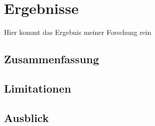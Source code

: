 \section{Ergebnisse}
Hier kommt das Ergebnis meiner Forschung rein
\subsection{Zusammenfassung}
\subsection{Limitationen}
\subsection{Ausblick}

\newpage
